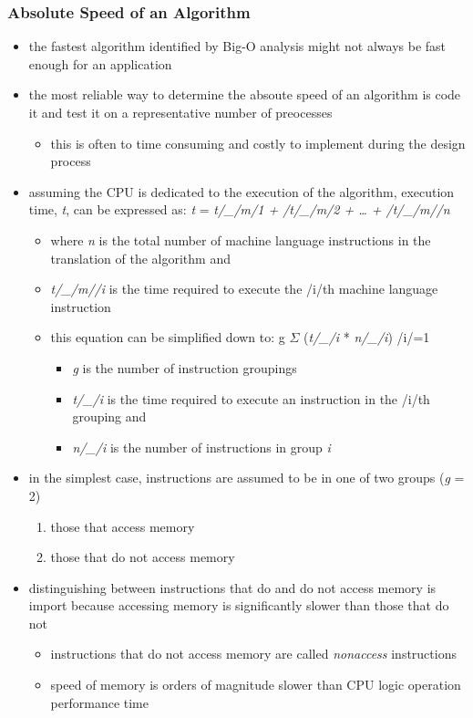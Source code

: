 \documentclass[11pt]{article}
\begin{document}
\subsubsection{Absolute Speed of an Algorithm}
\label{sec:org9875ed9}
\begin{itemize}
\item the fastest algorithm identified by Big-O analysis might not always be fast enough for an application
\item the most reliable way to determine the absoute speed of an algorithm is code it and test it on a representative number of preocesses
\begin{itemize}
\item this is often to time consuming and costly to implement during the design process
\end{itemize}
\item assuming the CPU is dedicated to the execution of the algorithm, execution time, \emph{t}, can be expressed as:
\emph{t} = \emph{t/\_/m/1 + /t/\_/m/2 + \ldots{} + /t/\_/m//n}
\begin{itemize}
\item where \emph{n} is the total number of machine language instructions in the translation of the algorithm
and
\item \emph{t/\_/m//i} is the time required to execute the /i/th machine language instruction
\item this equation can be simplified down to:
g
\(\Sigma\) (\emph{t/\_/i} * \emph{n/\_/i})
/i/=1
\begin{itemize}
\item \emph{g} is the number of instruction groupings
\item \emph{t/\_/i} is the time required to execute an instruction in the /i/th grouping
and
\item \emph{n/\_/i} is the number of instructions in group \emph{i}
\end{itemize}
\end{itemize}
\item in the simplest case, instructions are assumed to be in one of two groups (\emph{g} = 2)
\begin{enumerate}
\item those that access memory
\item those that do not access memory
\end{enumerate}
\item distinguishing between instructions that do and do not access memory is import because accessing memory is significantly slower than those that do not
\begin{itemize}
\item instructions that do not access memory are called \emph{nonaccess} instructions
\item speed of memory is orders of magnitude slower than CPU logic operation performance time
\end{itemize}
\end{itemize}
\end{document}
